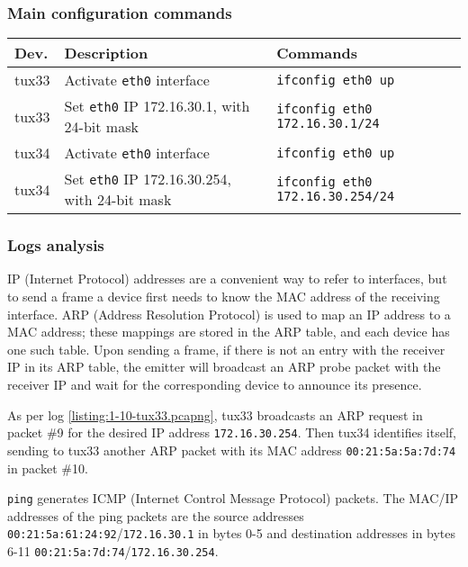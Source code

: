 \documentclass[a4paper, 11pt]{report}
\begin{document}
\subsubsection{Main configuration commands} \label{sec:Com1}

\begin{tabular}{l | p{75mm} | l}
    \textbf{Dev.} & \textbf{Description}                                  & \textbf{Commands}                       \\ \hline
    tux33         & Activate \texttt{eth0} interface                     & \texttt{ifconfig eth0 up}               \\
    tux33         & Set \texttt{eth0} IP 172.16.30.1, with 24-bit mask   & \texttt{ifconfig eth0 172.16.30.1/24}   \\ \hline
    tux34         & Activate \texttt{eth0} interface                     & \texttt{ifconfig eth0 up}               \\
    tux34         & Set \texttt{eth0} IP 172.16.30.254, with 24-bit mask & \texttt{ifconfig eth0 172.16.30.254/24} \\
\end{tabular}

\subsubsection{Logs analysis} \label{sec:Log1}

IP (Internet Protocol) addresses are a convenient way to refer to interfaces, but to send a frame a device first needs to know the MAC address of the receiving interface.
ARP (Address Resolution Protocol) is used to map an IP address to a MAC address; these mappings are stored in the ARP table, and each device has one such table.
Upon sending a frame, if there is not an entry with the receiver IP in its ARP table, the emitter will broadcast an ARP probe packet with the receiver IP and wait for the corresponding device to announce its presence.

As per log \ref{listing:1-10-tux33.pcapng}, tux33 broadcasts an ARP request in packet \#9 for the desired IP address \texttt{172.16.30.254}.
Then tux34 identifies itself, sending to tux33 another ARP packet with its MAC address \texttt{00:21:5a:5a:7d:74} in packet \#10.

\texttt{ping} generates ICMP (Internet Control Message Protocol) packets. The MAC/IP addresses of the ping packets are the source addresses \texttt{00:21:5a:61:24:92}/\texttt{172.16.30.1} in bytes 0-5
and destination addresses in bytes 6-11 \texttt{00:21:5a:7d:74}/\texttt{172.16.30.254}.
\end{document}
